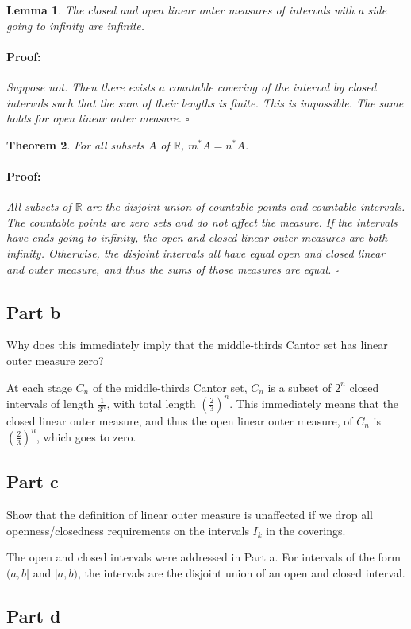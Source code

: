 \documentclass{article}
\newenvironment{proof}{\paragraph{Proof:}}{\hfill$\square$}
\newtheorem{theorem}{Theorem}
\newtheorem{lemma}[theorem]{Lemma}
\newcommand{\R}{\mathbb{R}}
\begin{document}
\begin{lemma}
The closed and open linear outer measures of intervals with a side going to infinity are infinite.
\begin{proof}
Suppose not. Then there exists a countable covering of the interval by closed intervals such that the sum of their lengths is finite. This is impossible. The same holds for open linear outer measure. 
\end{proof}
\end{lemma}

\begin{theorem}
For all subsets $A$ of $\R$, $m^*A = n^*A$.
\begin{proof}
All subsets of $\R$ are the disjoint union of countable points and countable intervals. The countable points are zero sets and do not affect the measure. If the intervals have ends going to infinity, the open and closed linear outer measures are both infinity. Otherwise, the disjoint intervals all have equal open and closed linear and outer measure, and thus the sums of those measures are equal.
\end{proof}
\end{theorem}

\subsection*{Part b}

Why does this immediately imply that the middle-thirds Cantor set has linear outer measure zero?

At each stage $C_n$ of the middle-thirds Cantor set, $C_n$ is a subset of $2^n$ closed intervals of length $\frac{1}{3^n}$, with total length $(\frac{2}{3})^n$. This immediately means that the closed linear outer measure, and thus the open linear outer measure, of $C_n$ is $(\frac{2}{3})^n$, which goes to zero.

\subsection*{Part c}

Show that the definition of linear outer measure is unaffected if we drop all openness/closedness requirements on the intervals $I_k$ in the coverings.

The open and closed intervals were addressed in Part a. For intervals of the form $(a, b]$ and $[a, b)$, the intervals are the disjoint union of an open and closed interval.

\subsection*{Part d}
\end{document}
